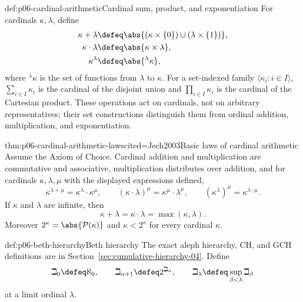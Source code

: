 \begin{hbdefinition}{def:p06-cardinal-arithmetic}{Cardinal sum, product, and exponentiation}
For cardinals \(\kappa,\lambda\), define
\[
\begin{aligned}
  \kappa+\lambda
    &\defeq\abs{(\kappa\times\{0\})\cup(\lambda\times\{1\})},\\
  \kappa\cdot\lambda
    &\defeq\abs{\kappa\times\lambda},\\
  \kappa^\lambda
    &\defeq\abs{{}^{\lambda}\kappa},
\end{aligned}
\]
where \({}^{\lambda}\kappa\) is the set of functions from \(\lambda\) to
\(\kappa\).  For a set-indexed family \(\langle\kappa_i:i\in I\rangle\),
\(\sum_{i\in I}\kappa_i\) is the cardinal of the disjoint union and
\(\prod_{i\in I}\kappa_i\) is the cardinal of the Cartesian product.
These operations act on cardinals, not on arbitrary representatives; their
set constructions distinguish them from ordinal addition, multiplication,
and exponentiation.
\end{hbdefinition}

\begin{hbtheorem}{thm:p06-cardinal-arithmetic-laws}{cited=Jech2003}{Basic laws of cardinal arithmetic}
Assume the Axiom of Choice.  Cardinal addition and multiplication are
commutative and associative, multiplication distributes over addition, and
for cardinals \(\kappa,\lambda,\mu\) with the displayed expressions defined,
\[
  \kappa^{\lambda+\mu}=\kappa^\lambda\cdot\kappa^\mu,
  \qquad
  (\kappa\cdot\lambda)^\mu=\kappa^\mu\cdot\lambda^\mu,
  \qquad
  (\kappa^\lambda)^\mu=\kappa^{\lambda\cdot\mu}.
\]
If \(\kappa\) and \(\lambda\) are infinite, then
\[
  \kappa+\lambda=\kappa\cdot\lambda=\max(\kappa,\lambda).
\]
Moreover \(2^\kappa=\abs{\mathcal P(\kappa)}\) and
\(\kappa<2^\kappa\) for every cardinal \(\kappa\).
\end{hbtheorem}


\begin{hbdefinition}{def:p06-beth-hierarchy}{Beth hierarchy}
The exact aleph hierarchy, CH, and GCH definitions are in
Section~\ref{sec:cumulative-hierarchy-04}.  Define
\[
  \beth_0\defeq\aleph_0,\qquad
  \beth_{\alpha+1}\defeq2^{\beth_\alpha},\qquad
  \beth_\lambda\defeq\sup_{\beta<\lambda}\beth_\beta
\]
at a limit ordinal \(\lambda\).
\end{hbdefinition}

